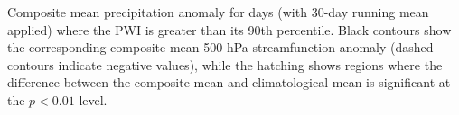 \label{fig:pr_composite}
Composite mean precipitation anomaly for days (with 30-day running mean applied) where the PWI is greater than its 90th percentile. Black contours show the corresponding composite mean 500 hPa streamfunction anomaly (dashed contours indicate negative values), while the hatching shows regions where the difference between the composite mean and climatological mean is significant at the $p < 0.01$ level.
